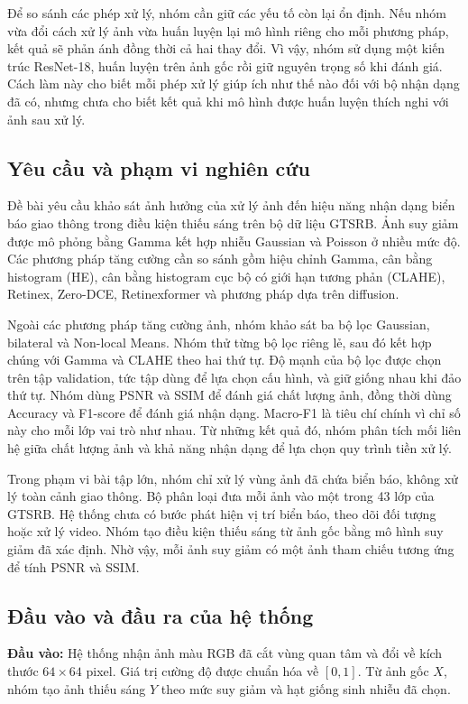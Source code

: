 Để so sánh các phép xử lý, nhóm cần giữ các yếu tố còn lại ổn định. Nếu nhóm vừa đổi cách xử lý ảnh vừa huấn luyện lại mô hình riêng cho mỗi phương pháp, kết quả sẽ phản ánh đồng thời cả hai thay đổi. Vì vậy, nhóm sử dụng một kiến trúc ResNet-18, huấn luyện trên ảnh gốc rồi giữ nguyên trọng số khi đánh giá. Cách làm này cho biết mỗi phép xử lý giúp ích như thế nào đối với bộ nhận dạng đã có, nhưng chưa cho biết kết quả khi mô hình được huấn luyện thích nghi với ảnh sau xử lý.

\subsection{Yêu cầu và phạm vi nghiên cứu}
Đề bài yêu cầu khảo sát ảnh hưởng của xử lý ảnh đến hiệu năng nhận dạng biển báo giao thông trong điều kiện thiếu sáng trên bộ dữ liệu GTSRB. Ảnh suy giảm được mô phỏng bằng Gamma kết hợp nhiễu Gaussian và Poisson ở nhiều mức độ. Các phương pháp tăng cường cần so sánh gồm hiệu chỉnh Gamma, cân bằng histogram (HE), cân bằng histogram cục bộ có giới hạn tương phản (CLAHE), Retinex, Zero-DCE, Retinexformer và phương pháp dựa trên diffusion.

Ngoài các phương pháp tăng cường ảnh, nhóm khảo sát ba bộ lọc Gaussian, bilateral và Non-local Means. Nhóm thử từng bộ lọc riêng lẻ, sau đó kết hợp chúng với Gamma và CLAHE theo hai thứ tự. Độ mạnh của bộ lọc được chọn trên tập validation, tức tập dùng để lựa chọn cấu hình, và giữ giống nhau khi đảo thứ tự. Nhóm dùng PSNR và SSIM để đánh giá chất lượng ảnh, đồng thời dùng Accuracy và F1-score để đánh giá nhận dạng. Macro-F1 là tiêu chí chính vì chỉ số này cho mỗi lớp vai trò như nhau. Từ những kết quả đó, nhóm phân tích mối liên hệ giữa chất lượng ảnh và khả năng nhận dạng để lựa chọn quy trình tiền xử lý.

Trong phạm vi bài tập lớn, nhóm chỉ xử lý vùng ảnh đã chứa biển báo, không xử lý toàn cảnh giao thông. Bộ phân loại đưa mỗi ảnh vào một trong 43 lớp của GTSRB. Hệ thống chưa có bước phát hiện vị trí biển báo, theo dõi đối tượng hoặc xử lý video. Nhóm tạo điều kiện thiếu sáng từ ảnh gốc bằng mô hình suy giảm đã xác định. Nhờ vậy, mỗi ảnh suy giảm có một ảnh tham chiếu tương ứng để tính PSNR và SSIM.

\subsection{Đầu vào và đầu ra của hệ thống}
\textbf{Đầu vào:} Hệ thống nhận ảnh màu RGB đã cắt vùng quan tâm và đổi về kích thước $64\times64$ pixel. Giá trị cường độ được chuẩn hóa về $[0,1]$. Từ ảnh gốc $X$, nhóm tạo ảnh thiếu sáng $Y$ theo mức suy giảm và hạt giống sinh nhiễu đã chọn.

